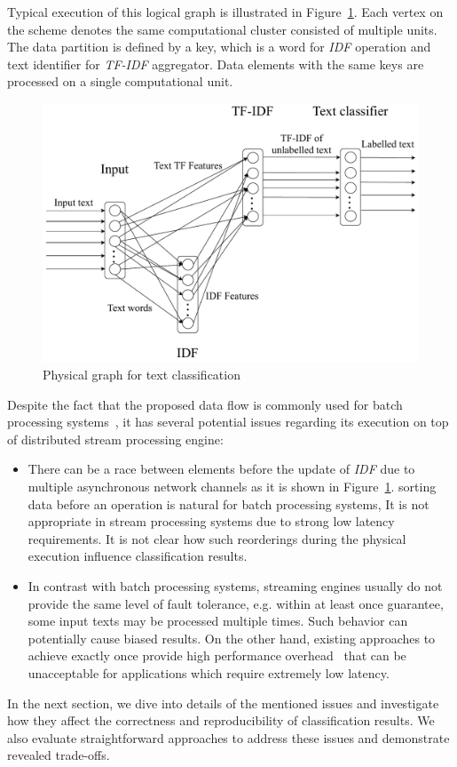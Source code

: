 Typical execution of this logical graph is illustrated in Figure~\ref{physical_graph}. Each vertex on the scheme denotes the same computational cluster consisted of multiple units. The data partition is defined by a key, which is a word for {\em IDF} operation and text identifier for {\em TF-IDF} aggregator. Data elements with the same keys are processed on a single computational unit.

\begin{figure}[htbp]
  \centering
  \includegraphics[scale=0.375]{pics/physical-graph-no-part-fit}
  \caption{Physical graph for text classification}
  \label {physical_graph}
\end{figure}

Despite the fact that the proposed data flow is commonly used for batch processing systems~\cite{semberecki2016distributed}, it has several potential issues regarding its execution on top of distributed stream processing engine:

\begin{itemize}
    \item There can be a race between elements before the update of {\em IDF} due to multiple asynchronous network channels as it is shown in Figure~\ref{physical_graph}. 
     sorting data before an operation is natural for batch processing systems,     It  is not appropriate in stream processing systems      due to strong low latency requirements.
    It is  not    clear how such reorderings during the physical execution influence classification results.
    
    \item 
    In contrast with batch processing systems, streaming engines usually do not provide the same level of fault tolerance, e.g. within at least once guarantee, some input texts may be processed multiple times. Such behavior can potentially cause biased results. On the other hand, existing approaches to achieve exactly once provide high performance overhead~\cite{we2018beyondmr} that can be unacceptable for applications which require extremely low latency.
\end{itemize}

In the next section, we dive into details of the mentioned issues and investigate how they affect the correctness and reproducibility of classification results. We also evaluate straightforward approaches to address these issues and demonstrate revealed trade-offs.